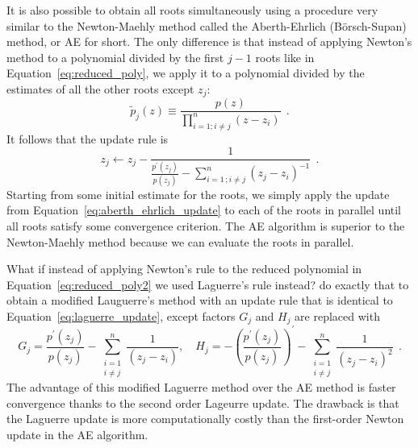 \documentclass[12pt,dvipsnames]{report}
\newcommand{\ssf}[1]{\textsf{#1}}
\newcommand{\hquad}{~~}
\begin{document}
It is also possible to obtain all roots simultaneously using a procedure very similar to 
the Newton-Maehly method called the \ssf{Aberth-Ehrlich} (\ssf{B\"{o}rsch-Supan}) method,
or AE for short. The only difference is that instead of applying Newton's method to a 
polynomial divided by the first $j-1$ roots like in Equation~\ref{eq:reduced_poly}, we 
apply it to a polynomial divided by the estimates of all the other roots except $z_j$:
\begin{equation}
    \tilde{p}_{j}(z) \equiv \frac{p(z)}{\prod_{i=1;i\neq j}^{n}(z-z_i)}
    \hquad .
    \label{eq:reduced_poly2}
\end{equation}
It follows that the update rule is 
\begin{equation}
    z_j \leftarrow z_j - \frac{1}{\frac{p^\prime (z_j)}{p(z_j)} - \sum_{i=1\,;i\neq j}^{n}\left(z_j-z_{i}\right)^{-1}}
    \hquad .
    \label{eq:aberth_ehrlich_update}
\end{equation}
Starting from some initial estimate for the roots, we simply apply the update from
Equation~\ref{eq:aberth_ehrlich_update} to each of the roots in parallel until all 
roots satisfy some convergence criterion. The AE algorithm is superior to the Newton-Maehly
method because we can evaluate the roots in parallel.

What if instead of applying Newton's rule to the reduced polynomial in 
Equation~\ref{eq:reduced_poly2} we used Laguerre's rule instead?  \citet{cameron2019} 
do exactly that to obtain a modified Lauguerre's method with an update rule that is 
identical to Equation~\ref{eq:laguerre_update}, except factors $G_j$ and $H_j$ are 
replaced with
\begin{equation}
    G_{j}=\frac{p^{\prime}\left(z_{j}\right)}{p\left(z_{j}\right)}-
    \sum_{\substack{i=1 \\ i \neq j}}^{n} \frac{1}{\left(z_{j}-z_{i}\right)} ,\quad H_{j}=-\left(\frac{p^{\prime}\left(z_{j}\right)}{p\left(z_{j}\right)}\right)^{\prime}-\sum_{\substack{i=1 \\ i \neq j}}^{n} \frac{1}{\left(z_{j}-z_{i}\right)^{2}}
    \hquad.
\end{equation}
The advantage of this modified Laguerre method over the AE method is faster convergence 
thanks to the second order Lageurre update. The drawback is that the Laguerre update is more 
computationally costly than the first-order Newton update in the AE algorithm. 
\end{document}
